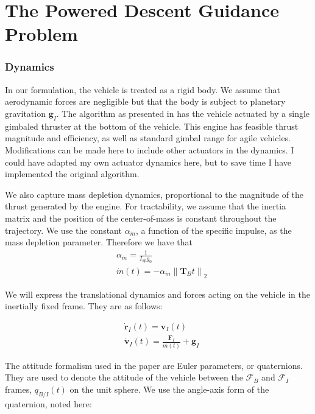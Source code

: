 \chapter{The Powered Descent Guidance Problem}
\label{mathchapter}



\subsection{Dynamics}
In our formulation, the vehicle is treated as a rigid body. We assume that aerodynamic forces are negligible but that the body is subject to planetary gravitation $\mathbf{g}_I$. The algorithm as presented in \cite{6dofsucc} has the vehicle actuated by a single gimbaled thruster at the bottom of the vehicle. This engine has feasible thrust magnitude and efficiency, as well as standard gimbal range for agile vehicles. Modifications can be made here to include other actuators in the dynamics. I could have adapted my own actuator dynamics here, but to save time I have implemented the original algorithm.

We also capture mass depletion dynamics, proportional to the magnitude of the thrust generated by the engine. For tractability, we assume that the inertia matrix and the position of the center-of-mass is constant throughout the trajectory. We use the constant $\alpha_{\dot{m}}$, a function of the specific impulse, as the mass depletion parameter. Therefore we have that
\begin{align}
& \alpha_{\dot{m}} = \frac{1}{I_{sp} g_0} \\
& \dot{m}(t) = -\alpha_{\dot{m}} \left\lVert \mathbf{T}_B{t} \right\rVert _2
\end{align}

We will express the translational dynamics and forces acting on the vehicle in the inertially fixed frame. They are as follows:

\begin{align}
& \dot{\mathbf{r}}_I(t) = \mathbf{v}_I(t) \\
& \dot{\mathbf{v}}_I(t) = \frac{\mathbf{F}_I}{m(t)} + \mathbf{g}_I
\end{align}

The attitude formalism used in the paper are Euler parameters, or quaternions. They are used to denote the attitude of the vehicle between the $\mathcal{F}_B$ and $\mathcal{F}_I$ frames, $q_{B/I}(t)$ on the unit sphere. We use the angle-axis form of the quaternion, noted here:

